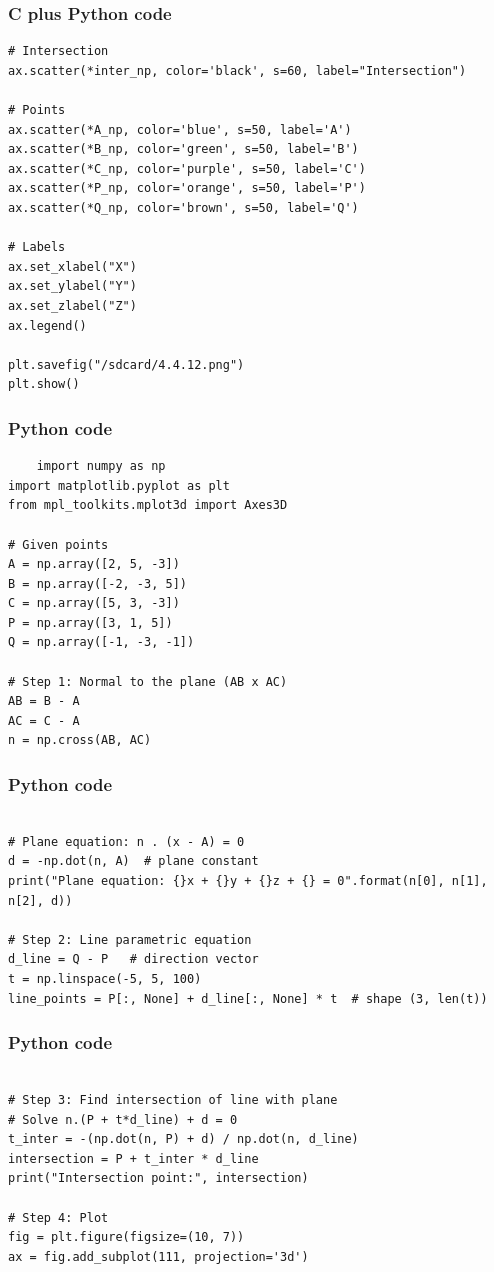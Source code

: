 \documentclass{beamer}
\begin{document}
\begin{frame}[fragile]
    \frametitle{C plus Python code}
    \begin{lstlisting}
# Intersection
ax.scatter(*inter_np, color='black', s=60, label="Intersection")

# Points
ax.scatter(*A_np, color='blue', s=50, label='A')
ax.scatter(*B_np, color='green', s=50, label='B')
ax.scatter(*C_np, color='purple', s=50, label='C')
ax.scatter(*P_np, color='orange', s=50, label='P')
ax.scatter(*Q_np, color='brown', s=50, label='Q')

# Labels
ax.set_xlabel("X")
ax.set_ylabel("Y")
ax.set_zlabel("Z")
ax.legend()

plt.savefig("/sdcard/4.4.12.png")
plt.show()
\end{lstlisting}
 
\end{frame}
\begin{frame}[fragile]
    \frametitle{Python code}
    \begin{lstlisting}
    import numpy as np
import matplotlib.pyplot as plt
from mpl_toolkits.mplot3d import Axes3D

# Given points
A = np.array([2, 5, -3])
B = np.array([-2, -3, 5])
C = np.array([5, 3, -3])
P = np.array([3, 1, 5])
Q = np.array([-1, -3, -1])

# Step 1: Normal to the plane (AB x AC)
AB = B - A
AC = C - A
n = np.cross(AB, AC)
\end{lstlisting}
 
\end{frame}
\begin{frame}[fragile]
    \frametitle{Python code}
    \begin{lstlisting}

# Plane equation: n . (x - A) = 0
d = -np.dot(n, A)  # plane constant
print("Plane equation: {}x + {}y + {}z + {} = 0".format(n[0], n[1], n[2], d))

# Step 2: Line parametric equation
d_line = Q - P   # direction vector
t = np.linspace(-5, 5, 100)
line_points = P[:, None] + d_line[:, None] * t  # shape (3, len(t))
\end{lstlisting}
 
\end{frame}
\begin{frame}[fragile]
    \frametitle{Python code}
    \begin{lstlisting}

# Step 3: Find intersection of line with plane
# Solve n.(P + t*d_line) + d = 0
t_inter = -(np.dot(n, P) + d) / np.dot(n, d_line)
intersection = P + t_inter * d_line
print("Intersection point:", intersection)

# Step 4: Plot
fig = plt.figure(figsize=(10, 7))
ax = fig.add_subplot(111, projection='3d')
\end{lstlisting}
 
\end{frame}
\end{document}
